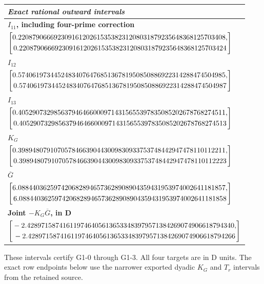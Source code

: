 {{
\normalsize
\renewcommand{\arraystretch}{1.14}
\begin{longtable}{@{}p{\textwidth}@{}}
\toprule
\emph{Exact rational outward intervals} \\
\midrule
\textbf{$I_{11}$, including four-prime correction} \\
$\left[\begin{gathered}{}0.2208790666923091612026153538231208031879235648368125703408,\\{}0.2208790666923091612026153538231208031879235648368125703424\end{gathered}\right]$ \\
\midrule
\textbf{$I_{12}$} \\
$\left[\begin{gathered}{}0.5740619734452483407647685136781950850886922314288474504985,\\{}0.5740619734452483407647685136781950850886922314288474504987\end{gathered}\right]$ \\
\midrule
\textbf{$I_{13}$} \\
$\left[\begin{gathered}{}0.4052907329856379464660009714315655397835085202678768274511,\\{}0.4052907329856379464660009714315655397835085202678768274513\end{gathered}\right]$ \\
\midrule
\textbf{$K_G$} \\
$\left[\begin{gathered}{}0.3989480791070578466390443009830933753748442947478110112211,\\{}0.3989480791070578466390443009830933753748442947478110112223\end{gathered}\right]$ \\
\midrule
\textbf{$\overline G$} \\
$\left[\begin{gathered}{}6.0884403625974206828946573628908904359431953974002641181857,\\{}6.0884403625974206828946573628908904359431953974002641181858\end{gathered}\right]$ \\
\midrule
\textbf{Joint $-K_G\overline G$, in D} \\
$\left[\begin{gathered}{}-2.4289715874161197464056136533483979571384269074906618794340,\\{}-2.4289715874161197464056136533483979571384269074906618794266\end{gathered}\right]$ \\
\bottomrule
\end{longtable}
}

These intervals certify G1-0 through G1-3.
All four targets are in D units.
The exact row endpoints below use the narrower exported dyadic $K_G$
and $T_r$ intervals from the retained source.

}
